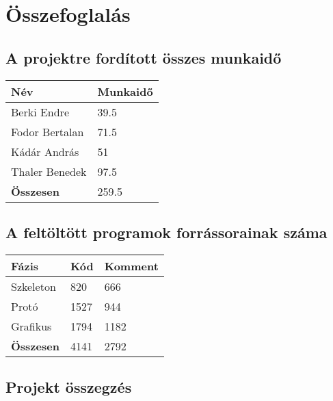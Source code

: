 

\usepackage{enumitem}
\usepackage{textcomp}
\usepackage[utf8]{inputenc}
\usepackage[T1]{fontenc}



\fedlap

\addtocounter{section}{13}
\section{Összefoglalás}

	\subsection{A projektre fordított összes munkaidő}
		\begin{center}
		    \begin{tabular}{ | l | l |}
			    \hline
			    \textbf{Név}		& \textbf{Munkaidő}	\\ \hline
				Berki Endre			& 39.5				\\ \hline
			    Fodor Bertalan		& 71.5				\\ \hline
			    Kádár András		& 51				\\ \hline
			    Thaler Benedek		& 97.5				\\ \hline
			    \hline
			    \textbf{Összesen}	& 259.5				\\ \hline
		    \end{tabular}
		\end{center}
	
	\subsection{A feltöltött programok forrássorainak száma}
		\begin{center}
		    \begin{tabular}{ | l | l | l |}
			    \hline
			    \textbf{Fázis}		& \textbf{Kód}	& \textbf{Komment}	\\ \hline
				Szkeleton			& 820			& 666				\\ \hline
			    Protó				& 1527			& 944				\\ \hline
			    Grafikus			& 1794			& 1182				\\ \hline
			    \hline
			    \textbf{Összesen}	& 4141			& 2792				\\ \hline
		    \end{tabular}
		\end{center}
	
	\subsection{Projekt összegzés}
		
